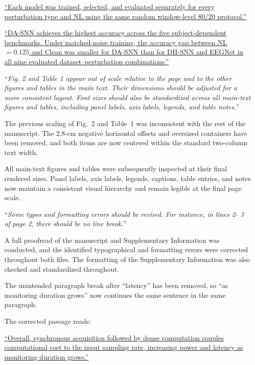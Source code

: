 \documentclass[12pt,technote,onecolumn]{IEEEtran}
\begin{document}
\uline{``Each model was trained, selected, and evaluated separately for every perturbation type and NL using the same random window-level 80/20 protocol.''}

\uline{``DA-SNN achieves the highest accuracy across the five subject-dependent benchmarks. Under matched-noise training, the accuracy gap between NL$=0.125$ and Clean was smaller for DA-SNN than for DH-SNN and EEGNet in all nine evaluated dataset--perturbation combinations.''}

\vspace{4mm}

``{\it Fig. 2 and Table 1 appear out of scale relative to the page and to the other figures and tables in the main text. Their dimensions should be adjusted for a more consistent layout. Font sizes should also be standardized across all main-text figures and tables, including panel labels, axis labels, legends, and table notes.}''
\vspace{1mm}

\par

The previous scaling of Fig.~2 and Table~1 was inconsistent with the rest of the manuscript. The 2.8-cm negative horizontal offsets and oversized containers have been removed, and both items are now centered within the standard two-column text width.

All main-text figures and tables were subsequently inspected at their final rendered sizes. Panel labels, axis labels, legends, captions, table entries, and notes now maintain a consistent visual hierarchy and remain legible at the final page scale.

\vspace{4mm}

``{\it Some typos and formatting errors should be revised. For instance, in lines 2- 3 of page 2, there should be no line break.}''
\vspace{1mm}

\par

A full proofread of the manuscript and Supplementary Information was conducted, and the identified typographical and formatting errors were corrected throughout both files. The formatting of the Supplementary Information was also checked and standardized throughout.

The unintended paragraph break after ``latency'' has been removed, so ``as monitoring duration grows'' now continues the same sentence in the same paragraph.

The corrected passage reads:

\uline{``Overall, synchronous acquisition followed by dense computation couples computational cost to the input sampling rate, increasing power and latency as monitoring duration grows.''}
\end{document}
